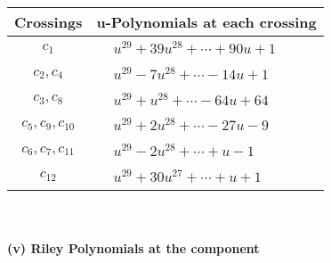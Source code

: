 \documentclass[1p]{elsarticle_modified}
\theoremstyle{definition}
\begin{document}
\begin{tabular}{m{50pt}|m{274pt}}
Crossings & \hspace{64pt}u-Polynomials at each crossing \\
\hline $$\begin{aligned}c_{1}\end{aligned}$$&$\begin{aligned}
&u^{29}+39 u^{28}+\cdots+90 u+1
\end{aligned}$\\
\hline $$\begin{aligned}c_{2},c_{4}\end{aligned}$$&$\begin{aligned}
&u^{29}-7 u^{28}+\cdots-14 u+1
\end{aligned}$\\
\hline $$\begin{aligned}c_{3},c_{8}\end{aligned}$$&$\begin{aligned}
&u^{29}+u^{28}+\cdots-64 u+64
\end{aligned}$\\
\hline $$\begin{aligned}c_{5},c_{9},c_{10}\end{aligned}$$&$\begin{aligned}
&u^{29}+2 u^{28}+\cdots-27 u-9
\end{aligned}$\\
\hline $$\begin{aligned}c_{6},c_{7},c_{11}\end{aligned}$$&$\begin{aligned}
&u^{29}-2 u^{28}+\cdots+u-1
\end{aligned}$\\
\hline $$\begin{aligned}c_{12}\end{aligned}$$&$\begin{aligned}
&u^{29}+30 u^{27}+\cdots+u+1
\end{aligned}$\\
\hline
\end{tabular}\\~\\
\newpage\renewcommand{\arraystretch}{1}
\flushleft \textbf{(v) Riley Polynomials at the component}\newline \\
\end{document}
